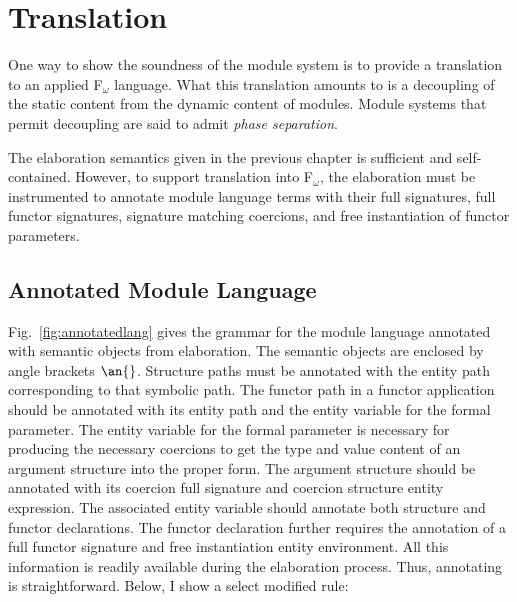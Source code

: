 
\chapter{Translation}\label{ch:translation}

One way to show the soundness of the module system is to provide a
translation to an applied F$_\omega$ language. What this translation
amounts to is a decoupling of the static content from the dynamic
content of modules. Module systems that permit decoupling are
said to admit \emph{phase separation}. 

The elaboration semantics given in the previous chapter is sufficient
and self-contained. However, to support translation into F$_\omega$,
the elaboration must be instrumented to annotate module language terms
with their full signatures, full functor signatures, signature
matching coercions, and free instantiation of functor parameters. 

\section{Annotated Module Language}



Fig.~\ref{fig:annotatedlang} gives the grammar for the module language
annotated with semantic objects from elaboration. The semantic objects
are enclosed by angle brackets $\an{}$. Structure paths must be
annotated with the entity path corresponding to that symbolic
path. The functor path in a functor application should be annotated
with its entity path and the entity variable for the formal
parameter. The entity variable for the formal parameter is necessary
for producing the necessary coercions to get the type and value
content of an argument structure into the proper form. The argument
structure should be annotated with its coercion full signature and coercion
structure entity expression. The associated entity variable should
annotate both structure and functor declarations. The functor
declaration further requires the annotation of a full functor
signature and free instantiation entity environment. All this
information is readily available during the elaboration process. Thus,
annotating is straightforward. Below, I show a select modified rule:  

